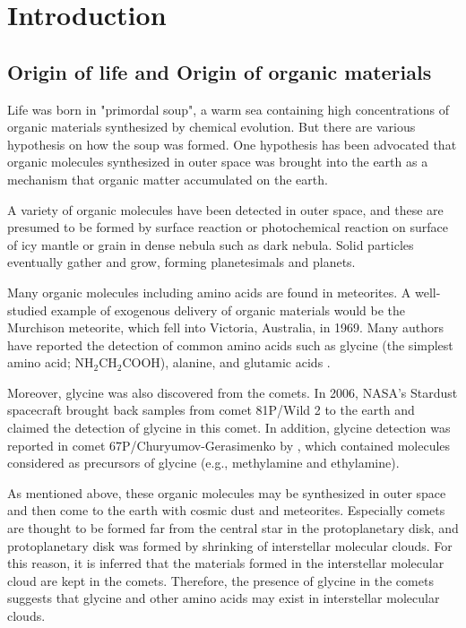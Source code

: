 \chapter{Introduction
  \label{chap:introduction}}


\section{Origin of life and Origin of organic materials}
Life was born in "primordal soup", a warm sea containing high concentrations of organic materials synthesized by chemical evolution. But there are various hypothesis on how the soup was formed.
One hypothesis has been advocated that organic molecules synthesized in outer space 
was brought into the earth as a mechanism that organic matter accumulated on the earth.

A variety of organic molecules have been detected in outer space, and these are presumed 
to be formed by surface reaction or photochemical reaction on surface of icy mantle or grain 
in dense nebula such as dark nebula.
Solid particles eventually gather and grow, forming planetesimals and planets.

Many organic molecules including amino acids are found in meteorites.
A well-studied example of exogenous delivery of organic materials would
be the Murchison meteorite, which fell into Victoria, Australia, in 1969. 
Many authors have reported the detection of common amino acids such as glycine 
(the simplest amino acid; NH$_2$CH$_2$COOH), alanine, and glutamic acids \citep[e.g., ][]{Engel+Nagy1982}.

Moreover, glycine was also discovered from the comets. 
In 2006, NASA's Stardust spacecraft brought back samples from comet 81P/Wild 2 to the earth 
and \citet{Elsila+2009} claimed the detection of glycine in this comet.
In addition, glycine detection was reported in comet 67P/Churyumov-Gerasimenko by \citet{Altwegg+2016},
which contained molecules considered as precursors of glycine (e.g., methylamine and ethylamine).

As mentioned above, these organic molecules may be synthesized in outer space and then 
come to the earth with cosmic dust and meteorites.
Especially comets are thought to be formed far from the central star in the protoplanetary disk, 
and protoplanetary disk was formed by shrinking of interstellar molecular clouds. 
For this reason, it is inferred that the materials formed in the interstellar molecular cloud 
are kept in the comets.
Therefore, the presence of glycine in the comets suggests that glycine and other amino acids 
may exist in interstellar molecular clouds.

